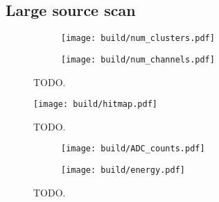 \subsection{Large source scan}

\begin{figure}[H]
  \centering
    \begin{subfigure}{0.5\textwidth}
      \texttt{[image: build/num\_clusters.pdf]}
    \end{subfigure}
    \begin{subfigure}{0.5\textwidth}
      \texttt{[image: build/num\_channels.pdf]}
    \end{subfigure}
  \caption{TODO.}
  \label{fig:RS_histograms}
\end{figure}

\begin{figure}[H]
  \centering
  \texttt{[image: build/hitmap.pdf]}
  \caption{TODO.}
  \label{fig:hitmap}
\end{figure}

\begin{figure}[H]
  \centering
    \begin{subfigure}{0.5\textwidth}
      \texttt{[image: build/ADC\_counts.pdf]}
    \end{subfigure}
    \begin{subfigure}{0.5\textwidth}
      \texttt{[image: build/energy.pdf]}
    \end{subfigure}
  \caption{TODO.}
  \label{fig:RS_distributions}
\end{figure}